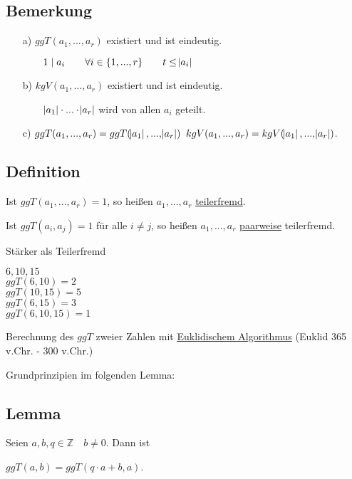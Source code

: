 \documentclass[a4paper, 12pt, twoside] {article}
\begin{document}
\subsection{Bemerkung} %

\begin{itemize}
\item[a)] $ggT(a_1,..., a_r)$ existiert und ist eindeutig.

	$\text{\qquad} 1 \mid a_i \qquad \forall i \in \{1,...,r\} \qquad t \leq \abs{a_i}$
	
\item[b)] $kgV(a_1,..., a_r)$ existiert und ist eindeutig.

	$\text{\qquad} \abs{a_1} \cdot ... \cdot \abs{a_r}$ wird von allen $a_i$ geteilt.
	
\item[c)] $ggT(a_1, ..., a_r) = ggT(\abs{a_1},...,\abs{a_r})$
	$kgV(a_1, ..., a_r) = kgV(\abs{a_1},...,\abs{a_r})$.
	
\end{itemize}

\subsection[Definition (teilerfremd, paarweise teilerfremd)]{Definition} %

Ist $ggT(a_1,...,a_r) = 1$, so heißen $a_1,...,a_r$ \underline{teilerfremd}.

Ist $ggT(a_i, a_j) = 1$	für alle $i \neq j$, so heißen $a_1,...,a_r$ \underline{paarweise} teilerfremd.

Stärker als Teilerfremd

$6,10,15$ \\
$ggT(6,10) = 2$ \\
$ggT(10,15) = 5$ \\
$ggT(6,15) = 3$ \\
$ggT(6,10,15) = 1$


Berechnung des $ggT$ zweier Zahlen mit \underline{Euklidischem Algorithmus} \hfill (Euklid 365 v.Chr. - 300 v.Chr.)

Grundprinzipien im folgenden Lemma:

\subsection[Lemma (Bestimmung des ggT)]{Lemma} %

Seien $a,b,q \in \mathbb{Z} \quad b \neq 0$. Dann ist

$ggT(a,b) = ggT(q \cdot a + b, a)$.
\end{document}
